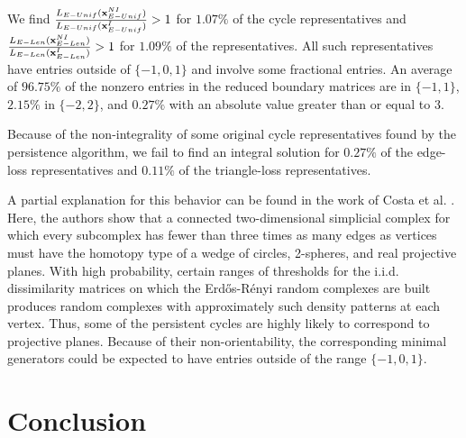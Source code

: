 We find $\frac{L_{E-Unif}(\mathbf{x}^{NI}_{E-Unif})}{L_{E-Unif}(\mathbf{x}^{I}_{E-Unif})}> 1$ for $1.07\%$ of the cycle representatives and $\frac{L_{E-Len}(\mathbf{x}^{NI}_{E-Len})}{L_{E-Len}(\mathbf{x}^{I}_{E-Len})}> 1$ for $1.09\%$ of the representatives. All such representatives have entries outside of $\{-1,0,1\}$ and involve some fractional entries. An average of $96.75\%$ of the nonzero entries in the reduced boundary matrices are in $\{-1,1\}$, $2.15\%$ in $\{-2,2\}$, and $0.27\%$ with an absolute value greater than or equal to $3$. 

Because of the non-integrality of some original cycle representatives found by the persistence algorithm, we fail to find an integral solution for $0.27\%$ of the edge-loss representatives and $0.11\%$ of the triangle-loss representatives. 

A partial explanation for this  behavior can be found in the work of Costa et al. \cite{erdos-renyi-RP2}. Here, the authors show that a connected two-dimensional simplicial complex for which every subcomplex has fewer than three times as many edges as vertices must have the homotopy type of a wedge of circles, 2-spheres, and real projective planes. With high probability, certain ranges of thresholds for the i.i.d. dissimilarity matrices on which the Erd\H{o}s-R\'enyi random complexes are built produces random complexes with approximately such density patterns at each vertex. Thus, some of the persistent cycles are highly likely to correspond to projective planes. Because of their non-orientability, the corresponding minimal generators could be expected to have entries outside of the range $\{-1, 0, 1\}.$

 \section{Conclusion}\label{discussion}


